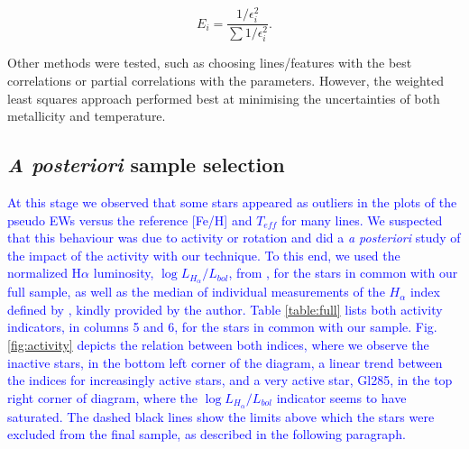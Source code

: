 \documentclass{aa}
\begin{document}


\begin{equation}
E_{i} = \frac{1/\epsilon_{i}^{2}}{\sum{1/\epsilon_{i}^{2}}}.
\label{eq:weight}
\end{equation}

Other methods were tested, such as choosing lines/features with the best correlations or partial correlations with the parameters. However, the weighted least squares approach performed best at minimising the uncertainties of both metallicity and temperature. 

\subsection{\textit{A posteriori} sample selection}
\label{sec:sample}

\textcolor{blue}{ At this stage we observed that some stars appeared as outliers in the plots of the pseudo EWs versus the reference [Fe/H] and $T_{eff}$ for many lines. We suspected that this behaviour was due to activity or rotation and did a \textit{a posteriori} study of the impact of the activity with our technique. To this end, we used the normalized H$\alpha$ luminosity, $\log{L_{H_{\alpha}}/L_{bol}}$, from \citet{Reiners-2012}, for the stars in common with our full sample, as well as the median of individual measurements of the $H_{\alpha}$ index defined by \citet{Gomes_da_Silva-2011}, kindly provided by the author. Table \ref{table:full} lists both activity indicators, in columns 5 and 6, for the stars in common with our sample. Fig. \ref{fig:activity} depicts the relation between both indices, where we observe the inactive stars, in the bottom left corner of the diagram, a linear trend between the indices for increasingly active stars, and a very active star, Gl285, in the top right corner of diagram, where the  $\log{L_{H_{\alpha}}/L_{bol}}$ indicator seems to have saturated. The dashed black lines show the limits above which the stars were excluded from the final sample, as described in the following paragraph. 
}
\end{document}
